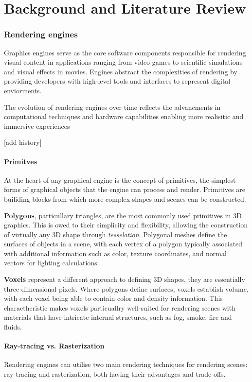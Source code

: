 
\part{Background and Literature Review}\label{backgorund}
\section{Rendering engines}
Graphics engines serve as the core software components responsible for rendering visual content in applications ranging from video games to scientific simulations and visual effects in movies.
Engines abstract the complexities of rendering by providing developers with high-level tools and interfaces to represent digital enviorments.

The evolution of rendering engines over time reflects the advancments in computational techniques and hardware capabilities enabling more realisitic and immersive experiences

[add history]
\subsection{Primitves}
At the heart of any graphical engine is the concept of primitives, the simplest forms of graphical objects that the engine can process and render. Primitives are builiding blocks from which more complex shapes and scenes can be constructed.

\textbf{Polygons}, particullary triangles, are the most commonly used primitives in 3D graphics. This is owed to their simplicity and flexibility, allowing the construction of virtually any 3D shape through \emph{tesselation}. Polygonal meshes define the surfaces of objects in a scene, with each vertex of a polygon typically associated with additional information such as color, texture coordinates, and normal vectors for lighting calculations.

\textbf{Voxels} represent a different approach to defining 3D shapes, they are essentially three-dimensional pixels. Where polygons define surfaces, voxels establish volume, with each voxel being able to contain color and density information.
This charactheristic makes voxels particuallry well-suited for rendering scenes with materials that have intricate internal structures, such as fog, smoke, fire and fluids.

\subsection{Ray-tracing vs. Rasterization}
Rendering engines can utilise two main rendering techniques for rendering scenes: ray tracing and rasterization, both having their advantages and trade-offs.

